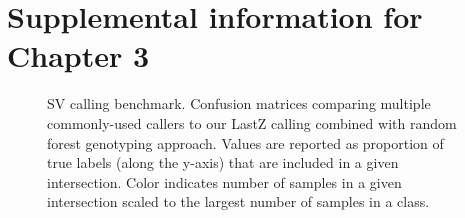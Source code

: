 \chapter{Supplemental information for Chapter 3}


\begin{figure}
    \centering
    \caption[SV calling benchmark.]{SV calling benchmark. Confusion matrices comparing multiple commonly-used callers to our LastZ calling combined with random forest genotyping approach. Values are reported as proportion of true labels (along the y-axis) that are included in a given intersection. Color indicates number of samples in a given intersection scaled to the largest number of samples in a class.}
    \label{fig:svbench}
\end{figure}


